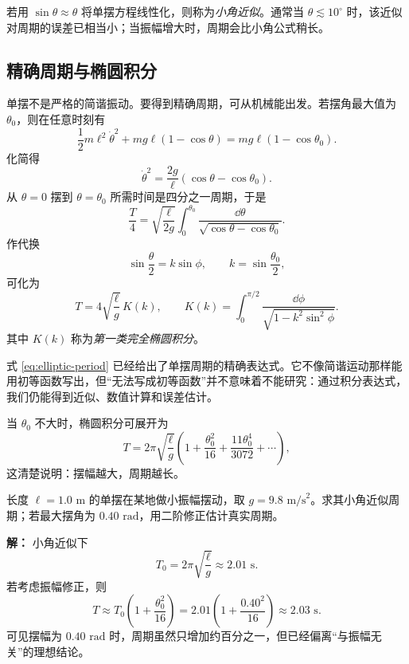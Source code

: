 \begin{definition}
若用 $\sin\theta\approx\theta$ 将单摆方程线性化，则称为\emph{小角近似}。通常当 $\theta\lesssim 10^\circ$ 时，该近似对周期的误差已相当小；当振幅增大时，周期会比小角公式稍长。
\end{definition}

\subsection{精确周期与椭圆积分}

单摆不是严格的简谐振动。要得到精确周期，可从机械能出发。若摆角最大值为 $\theta_0$，则在任意时刻有
\[
\frac12 m\ell^2\dot\theta^2+mg\ell(1-\cos\theta)=mg\ell(1-\cos\theta_0).
\]
化简得
\[
\dot\theta^2=\frac{2g}{\ell}(\cos\theta-\cos\theta_0).
\]
从 $\theta=0$ 摆到 $\theta=\theta_0$ 所需时间是四分之一周期，于是
\[
\frac{T}{4}=\sqrt{\frac{\ell}{2g}}\int_0^{\theta_0}\frac{\dd\theta}{\sqrt{\cos\theta-\cos\theta_0}}.
\]
作代换
\[
\sin\frac{\theta}{2}=k\sin\phi,
\qquad
k=\sin\frac{\theta_0}{2},
\]
可化为
\begin{equation}
T=4\sqrt{\frac{\ell}{g}}\,K(k),
\qquad
K(k)=\int_0^{\pi/2}\frac{\dd\phi}{\sqrt{1-k^2\sin^2\phi}}.
\label{eq:elliptic-period}
\end{equation}
其中 $K(k)$ 称为\emph{第一类完全椭圆积分}。

\begin{remark}
式 \eqref{eq:elliptic-period} 已经给出了单摆周期的精确表达式。它不像简谐运动那样能用初等函数写出，但“无法写成初等函数”并不意味着不能研究：通过积分表达式，我们仍能得到近似、数值计算和误差估计。
\end{remark}

当 $\theta_0$ 不大时，椭圆积分可展开为
\[
T=2\pi\sqrt{\frac{\ell}{g}}\left(1+\frac{\theta_0^2}{16}+\frac{11\theta_0^4}{3072}+\cdots\right),
\]
这清楚说明：摆幅越大，周期越长。

\begin{example}
长度 $\ell=1.0\text{ m}$ 的单摆在某地做小振幅摆动，取 $g=9.8\text{ m/s}^2$。求其小角近似周期；若最大摆角为 $0.40\text{ rad}$，用二阶修正估计真实周期。

\textbf{解：} 小角近似下
\[
T_0=2\pi\sqrt{\frac{\ell}{g}}\approx 2.01\text{ s}.
\]
若考虑振幅修正，则
\[
T\approx T_0\left(1+\frac{\theta_0^2}{16}\right)
=2.01\left(1+\frac{0.40^2}{16}\right)
\approx 2.03\text{ s}.
\]
可见摆幅为 $0.40\text{ rad}$ 时，周期虽然只增加约百分之一，但已经偏离“与振幅无关”的理想结论。
\end{example}

